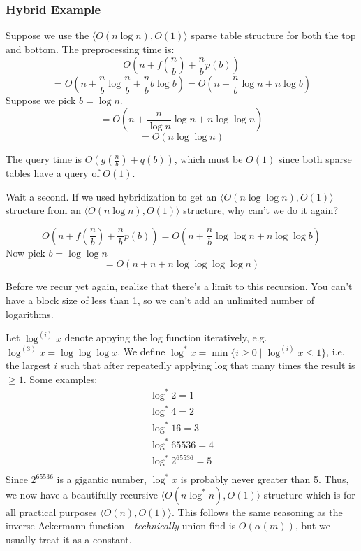 \documentclass[11pt, oneside]{article}
\begin{document}
\subsubsection{Hybrid Example}

Suppose we use the \( \langle O(n \log n), O(1) \rangle \) sparse table
structure for both the top and bottom.
The preprocessing time is:
\[ O(n + f(\frac{n}{b}) + \frac{n}{b} p(b)) \]
\[ = O(n + \frac{n}{b} \log \frac{n}{b} + \frac{n}{b} b \log b) = O(n + \frac{n}{b} \log n + n \log b) \]
Suppose we pick \( b = \log n \).
\[ = O(n + \frac{n}{\log n} \log n + n \log {\log n}) \]
\[ = O(n \log {\log n}) \]

The query time is \( O(g(\frac{n}{b}) + q(b)) \), which
must be \( O(1) \) since both sparse tables have a query of \( O(1) \).

Wait a second. If we used hybridization to get an \( \langle O(n \log \log n), O(1) \rangle \) structure
from an \( \langle O(n \log n), O(1) \rangle \) structure, why can't we do it again?

\[ O(n + f(\frac{n}{b}) + \frac{n}{b} p(b)) = O(n + \frac{n}{b} \log \log n + n \log \log b) \]
Now pick \( b = \log \log n \)
\[ = O(n + n + n \log \log \log \log n) \]

Before we recur yet again, realize that there's a limit to this recursion. You can't have a block size of
less than 1, so we can't add an unlimited number of logarithms.

Let \( \log^{(i)} x \) denote appying the log function iteratively, e.g. \( \log^{(3)} x = \log \log \log x \). We define \( \log^* x = \min\{ i \geq 0 \mid \log^{(i)} x \leq 1\} \), i.e. the largest \( i \) such that after repeatedly applying log that many times the result is \( \geq 1 \). Some examples:
\begin{align*}
        \log^* 2 = 1 \\
        \log^* 4 = 2 \\
       \log^* 16 = 3 \\
    \log^* 65536 = 4 \\
\log^* 2^{65536} = 5 \\
\end{align*}
Since \( 2^{65536} \) is a gigantic number, \( \log^* x \) is probably never greater than 5.
Thus, we now have a beautifully recursive \( \langle O(n \log^* n), O(1) \rangle \) structure which is for all practical purposes \( \langle O(n), O(1) \rangle \).
This follows the same reasoning as the inverse Ackermann function - \textit{technically}
union-find is \( O(\alpha(m)) \), but we usually treat it as a constant.
\end{document}
